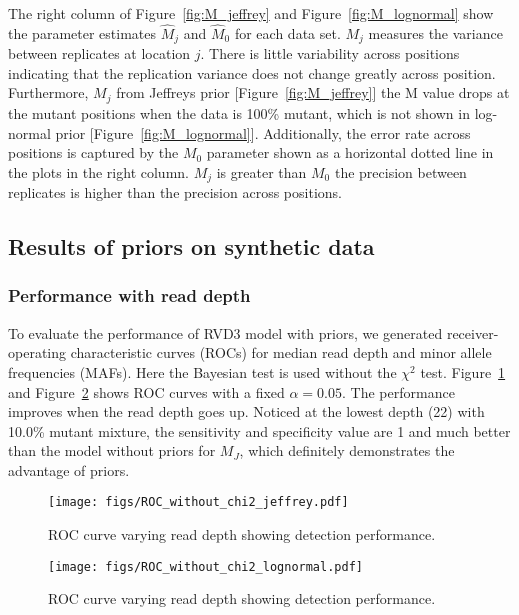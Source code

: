 \documentclass[11pt,reqno]{amsart}
\begin{document}
The right column of Figure~\ref{fig:M_jeffrey} and Figure~\ref{fig:M_lognormal} show the parameter estimates $\hat{M}_j$ and $\hat{M}_0$ for each data set. $M_j$ measures the variance between replicates at location $j$. There is little variability across positions indicating that the replication variance does not change greatly across position. Furthermore, $M_j$ from Jeffreys prior [Figure~\ref{fig:M_jeffrey}] the M value drops at the mutant positions when the data is 100\% mutant, which is not shown in log-normal prior [Figure~\ref{fig:M_lognormal}]. Additionally, the error rate across positions is captured by the $M_0$ parameter shown as a horizontal dotted line in the plots in the right column. $M_j$ is greater than $M_0$ the precision between replicates is higher than the precision across positions.

\subsection{Results of priors on synthetic data}
\subsubsection{Performance with read depth}
To evaluate the performance of RVD3 model with priors, we generated receiver-operating characteristic curves (ROCs) for median read depth and minor allele frequencies (MAFs). Here the Bayesian test is used without the $\chi^2$ test. Figure~\ref{fig:ROC_jeffrey} and Figure~\ref{fig:ROC_lognormal} shows ROC curves with a fixed $\alpha=0.05$. The performance improves when the read depth goes up. Noticed at the lowest depth (22) with 10.0\% mutant mixture, the sensitivity and specificity value are 1 and much better than the model without priors for $M_J$, which definitely demonstrates the advantage of priors.

\begin{figure}[htbp]
\begin{center}
\texttt{[image: figs/ROC\_without\_chi2\_jeffrey.pdf]}
\caption{ROC curve varying read depth showing detection performance.}
\label{fig:ROC_jeffrey}
\end{center}
\end{figure}


\begin{figure}[htbp]
\begin{center}
\texttt{[image: figs/ROC\_without\_chi2\_lognormal.pdf]}
\caption{ROC curve varying read depth showing detection performance.}
\label{fig:ROC_lognormal}
\end{center}
\end{figure}
\end{document}
